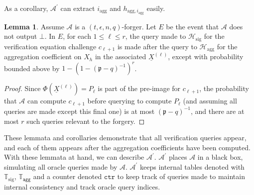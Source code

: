 \documentclass{mrl}
\theoremstyle{definition}
\numberwithin{theorem}{subsection}
\newtheorem{lemma}[theorem]{Lemma}
\newcommand{\adversary}{\mathcal{A}}
\newcommand{\p}{\mathfrak{p}}
\begin{document}
As a corollary, $\adversary^\prime$ can extract $i_{\text{agg}}$ and $h_{\text{agg}, i_{\text{agg}}}$ easily.

\begin{lemma}
Assume $\adversary$ is a $(t, \epsilon, n, q)$-forger. Let $E$ be the event that $\adversary$ does not output $\bot$. In $E$, for each $1 \leq \ell \leq r$, the query made to $\mathcal{H}_{\text{sig}}$ for the verification equation challenge $c_{\ell+1}$ is made after the query to $\mathcal{H}_{\text{agg}}$ for the aggregation coefficient on $X_h$ in the associated $\underline{X}^{(\ell)}$, except with probability bounded above by $1-(1-(\p - q)^{-1})^{r}$.
\end{lemma}
\begin{proof} Since $\Phi(\underline{X}^{(\ell)}) = P_\ell$ is part of the pre-image for $c_{\ell+1}$, the probability that $\adversary$ can compute $c_{\ell+1}$ before querying to compute $P_\ell$ (and assuming all queries are made except this final one) is at most  $(\p - q)^{-1}$, and there are at most $r$ such queries relevant to the forgery.
\end{proof}

These lemmata and corollaries demonstrate that all verification queries appear, and each of them appears after the aggregation coefficients have been computed. With these lemmata at hand, we can   describe $\adversary^\prime$. $\adversary^\prime$ places $\adversary$ in a black box, simulating all oracle queries made by $\adversary$. $\adversary^\prime$ keeps internal tables denoted with $\mathbb{T}_{\text{sig}}$, $\mathbb{T}_{\texttt{agg}}$ and a counter denoted $\texttt{ctr}$ to keep track of queries made to maintain internal consistency and track oracle query indices.
\end{document}

